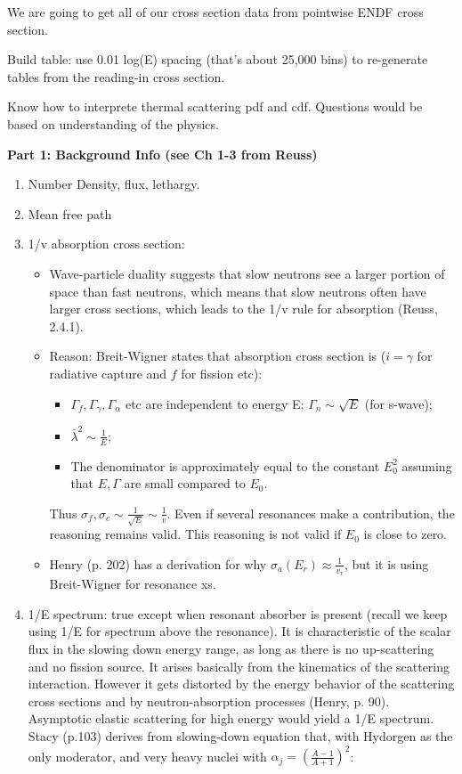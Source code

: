 \documentclass{school-22.211-notes}
\begin{document}
We are going to get all of our cross section data from pointwise ENDF cross section. 

Build table: use 0.01 log(E) spacing (that's about 25,000 bins) to re-generate tables from the reading-in cross section. 


Know how to interprete thermal scattering pdf and cdf. Questions would be based on understanding of the physics. 

\textbf{Part 1: Background Info (see Ch 1-3 from Reuss)}
\begin{enumerate}
\item Number Density, flux, lethargy.  
\item Mean free path
\item 1/v absorption cross section: 
  \begin{itemize}
  \item Wave-particle duality suggests that slow neutrons see a larger portion of space than fast neutrons, which means that slow neutrons often have larger cross sections, which leads to the 1/v rule for absorption (Reuss, 2.4.1). 
  \item Reason: Breit-Wigner states that absorption cross section is ($i = \gamma$ for radiative capture and $f$ for fission etc):
    \begin{itemize}
    \item $\Gamma_f, \Gamma_{\gamma}, \Gamma_{\alpha}$ etc are independent to energy E; $\Gamma_n \sim \sqrt{E}$ (for s-wave);
    \item $\bar{\lambda}^2 \sim \frac{1}{E}$;
    \item The denominator is approximately equal to the constant $E_0^2$ assuming that $E, \Gamma$ are small compared to $E_0$.
    \end{itemize}
    Thus $\sigma_f, \sigma_c \sim \frac{1}{\sqrt{E}} \sim \frac{1}{v}$. Even if several resonances make a contribution, the reasoning remains valid. This reasoning is not valid if $E_0$ is close to zero. 
  \item Henry (p. 202) has a derivation for why $\sigma_a(E_r) \approx \frac{1}{v_r}$, but it is using Breit-Wigner for resonance xs. 
  \end{itemize}
\item 1/E spectrum: true except when resonant absorber is present (recall we keep using 1/E for spectrum above the resonance). It is characteristic of the scalar flux in the slowing down energy range, as long as there is no up-scattering and no fission source. It arises basically from the kinematics of the scattering interaction. However it gets distorted by the energy behavior of the scattering cross sections and by neutron-absorption processes (Henry, p. 90). Asymptotic elastic scattering for high energy would yield a 1/E spectrum. Stacy (p.103) derives from slowing-down equation that, with Hydorgen as the only moderator, and very heavy nuclei with $\alpha_j = \left(\frac{A-1}{A+1} \right)^2$:

\end{enumerate}
\end{document}
